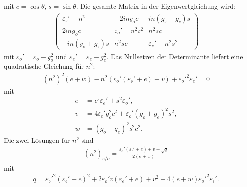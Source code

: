 \documentclass[twocolumn,10pt,DIV18]{scrartcl}
\newcommand{\eps}{\varepsilon}
\renewcommand{\[}{\left[}
\renewcommand{\]}{\right]}
\renewcommand{\(}{\left(}
\renewcommand{\)}{\right)}
\begin{document}
  mit $c=\cos\theta$, $s=\sin\theta$.  Die gesamte Matrix in der
  Eigenwertgleichung wird:
  \begin{align}
    \!\!\!\begin{pmatrix}
      \eps_o'-n^2    &  -2ing_oc           &   in(g_o+g_e)s       \\
      2ing_o c       &  \eps_o'-n^2c^2     &   n^2sc              \\
      -in(g_o+g_e)s  &  n^2sc              &   \eps_e'-n^2s^2
    \end{pmatrix}
  \end{align}
  mit $\eps_o'=\eps_o-g_o^2$ und $\eps_e'=\eps_e-g_e^2$.  Das
  Nullsetzen der Determinante liefert eine quadratische Gleichung
  f\"ur $n^2$:
  \begin{align}
    (n^2)^2(e+w)-n^2\(\eps_o'(\eps_o'+e)+v\)+\eps_o'^2\eps_e'=0
  \end{align}
  mit
  \begin{align}
    e&=c^2\eps_e'+s^2\eps_o',\\
    v&=4\eps_e'g_o^2c^2+\eps_o'(g_o+g_e)^2s^2, \\
    w&=(g_o-g_e)^2s^2c^2.
  \end{align}
  Die zwei L\"osungen f\"ur $n^2$ sind
  \begin{align}
    (n^2)_{e/o}=\frac{\eps_o'(\eps_e'+e)+v
      \pm\sqrt{q}}{2(e+w)}
  \end{align}
  mit
  \begin{align}
    q=\eps_o'^2(\eps_o'+e)^2+2\eps_o'v(\eps_e'+e)+v^2-4(e+w)\eps_o'^2\eps_e'.
  \end{align}
\end{document}
